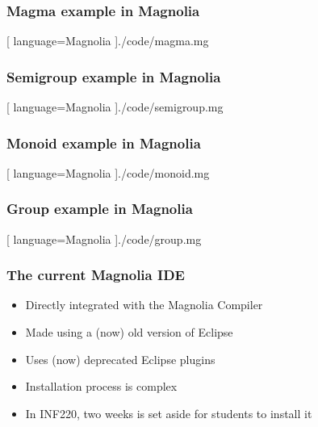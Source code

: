 \begin{frame}
  \frametitle{Magma example in Magnolia}
  \begin{center}
    
    [ language=Magnolia
    ]{./code/magma.mg}
  \end{center}
\end{frame}

\begin{frame}
  \frametitle{Semigroup example in Magnolia}
  \begin{center}
    
    [ language=Magnolia
    ]{./code/semigroup.mg}
  \end{center}
\end{frame}

\begin{frame}
  \frametitle{Monoid example in Magnolia}
  \begin{center}
    
    [ language=Magnolia
    ]{./code/monoid.mg}
  \end{center}
\end{frame}

\begin{frame}
  \frametitle{Group example in Magnolia}
  \begin{center}
    
    [ language=Magnolia
    ]{./code/group.mg}
  \end{center}
\end{frame}

\begin{frame}
  \frametitle{The current Magnolia IDE}
  \pause
  \begin{itemize}
    \item Directly integrated with the Magnolia Compiler
      \pause
    \item Made using a (now) old version of Eclipse
      \pause
    \item Uses (now) deprecated Eclipse plugins
      \pause
    \item Installation process is complex
      \pause
    \item In INF220, two weeks is set aside for students to install it
  \end{itemize}
\end{frame}

